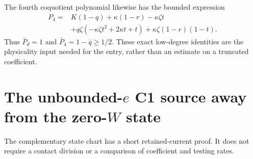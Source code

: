 The fourth coquotient polynomial likewise has the bounded expression
\[
\begin{split}
 P_4={}&K(1-q)+\kappa(1-r)-\kappa\zeta t\\
 &+q\zeta(-\kappa\zeta t^2+2\kappa t+t)
   +\kappa\zeta(1-r)(1-t).
\end{split}                                                       \tag{CE7}
\]
Thus $\bar P_d=1$ and $\bar P_4=1-\bar q\ge1/2$.
These exact low-degree identities are the physicality input needed
for the entry, rather than an estimate on a truncated coefficient.



\section{\texorpdfstring{The unbounded-$e$ C1 source away from the zero-$W$ state}{The unbounded-e C1 source away from the zero-W state}}
\label{component:p7ef919c24082}

\label{p7ef919c24082:sec:c1-unbounded-e-w-unit}

The complementary state chart has a short retained-current proof.  It
does not require a contact division or a comparison of coefficient and
testing rates.

